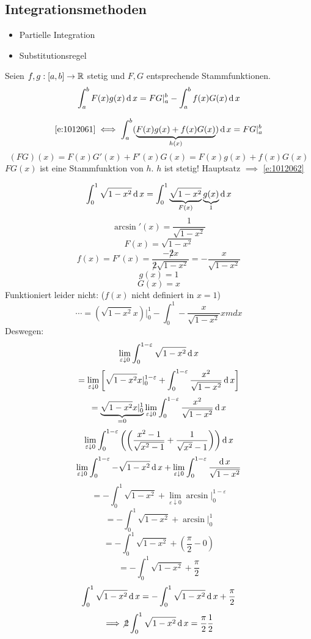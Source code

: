 \subsection{Integrationsmethoden}
\begin{itemize}
  \item Partielle Integration
  \item Substitutionsregel
\end{itemize}
\begin{Sat}
  Seien $f,g:[a,b]\to\mathbb{R}$ stetig und $F,G$ entsprechende Stammfunktionen.
  \begin{equation}\label{e:1012061}
    \int_a^bF(x)g(x)\operatorname{d} x=FG|_a^b-\int_a^bf(x)G(x)\operatorname{d} x
  \end{equation}
\end{Sat}
\begin{Bew}
  \begin{equation}\label{e:1012062}
    \ref{e:1012061}\iff\int_a^b(\underbrace{F(x)g(x)+f(x)G(x)}_{h(x)})\operatorname{d} x = FG|_a^b
  \end{equation}
  \[(FG)(x)=F(x)G'(x)+F'(x)G(x)=F(x)g(x) + f(x)G(x)\]
  $FG(x)$ ist eine Stammfunktion von $h$. $h$ ist stetig!
  Hauptsatz $\implies$ \ref{e:1012062}
\end{Bew}
\begin{Bsp}
  \[\int_0^1\sqrt{1-x^2}\operatorname{d} x=\int_0^1\underbrace{\sqrt{1-x^2}}_{F(x)}\underbrace{g(x)}_1\operatorname{d} x\]
  \[\arcsin'(x)=\frac{1}{\sqrt{1-x^2}}\]
  \[F(x)=\sqrt{1-x^2}\]
  \[f(x)=F'(x)=\frac{-\not 2 x}{\not 2\sqrt{1-x^2}}=-\frac{x}{\sqrt{1-x^2}}\]
  \[g(x)=1\]
  \[G(x)=x\]
  Funktioniert leider nicht: ($f(x)$ nicht definiert in $x=1$)
  \[\cdots=\left( \sqrt{1-x^2}x \right)|_0^1-\int_0^1-\frac{x}{\sqrt{1-x^2}}xmd x\]
  Deswegen:
  \[\lim_{\varepsilon\downarrow 0}\int_0^{1-\varepsilon}\sqrt{1-x^2}\operatorname{d} x\]
  \[=\lim_{\varepsilon\downarrow 0}\left[ \sqrt{1-x^2}x|_0^{1-\varepsilon}+\int_0^{1-\varepsilon}\frac{x^2}{\sqrt{1-x^2}}\operatorname{d} x \right]\]
  \[=\underbrace{\sqrt{1-x^2}x|_0^1}_{=0}\lim_{\varepsilon\downarrow 0}\int_0^{1-\varepsilon}\frac{x^2}{\sqrt{1-x^2}}\operatorname{d} x\]
  \[\lim_{\varepsilon\downarrow 0}\int_0^{1-\varepsilon}\left( \left( \frac{x^2-1}{\sqrt{x^2-1}}+\frac{1}{\sqrt{x^2}-1} \right) \right)\operatorname{d} x\]
  \[\lim_{\varepsilon\downarrow 0}\int_0^{1-\varepsilon}-\sqrt{1-x^2}\operatorname{d} x+\lim_{\varepsilon\downarrow 0}\int_0^{1-\varepsilon}\frac{\operatorname{d} x}{\sqrt{1-x^2}}\]
  \[=-\int_0^1\sqrt{1-x^2}+\lim_{\varepsilon\downarrow 0}\arcsin|_0^{1-\varepsilon}\]
  \[=-\int_0^1\sqrt{1-x^2}+\arcsin|_0^{1}\]
  \[=-\int_0^1\sqrt{1-x^2}+\left( \frac{\pi}{2}-0 \right)\]
  \[=-\int_0^1\sqrt{1-x^2}+\frac{\pi}{2}\]
  \[\int_0^1\sqrt{1-x^2}\operatorname{d} x=-\int_0^1\sqrt{1-x^2}\operatorname{d} x+\frac{\pi}{2}\]
  \[\implies\not 2\int_0^1\sqrt{1-x^2}\operatorname{d} x=\frac{\pi}{2}\frac{1}{2}\]
\end{Bsp}
